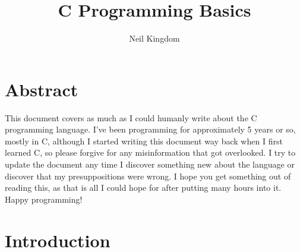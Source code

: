\documentclass{article}
\begin{document}
\renewcommand\maketitlehooka{\vfill}
\renewcommand\maketitlehookd{\vfill}

\begin{titlingpage}
    \title{C Programming Basics}
    \author{Neil Kingdom}
    \maketitle
\end{titlingpage}

\newpage

\tableofcontents

\newpage

\section{Abstract}

This document covers as much as I could humanly write about the C programming language. I’ve been programming
for approximately 5 years or so, mostly in C, although I started writing this document way back when I first
learned C, so please forgive for any misinformation that got overlooked. I try to update the document any time
I discover something new about the language or discover that my presuppositions were wrong. I hope you get
something out of reading this, as that is all I could hope for after putting many hours into it. Happy
programming!

\section{Introduction}
\end{document}
